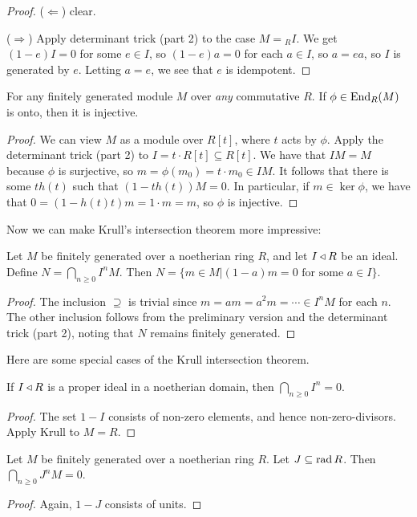  \begin{proof}
   ($\Leftarrow$) clear.

   ($\Rightarrow$) Apply determinant trick (part 2) to the case $M={}_R I$. We get
   $(1-e)I=0$ for some $e\in I$, so $(1-e)a=0$ for each $a\in I$, so $a=ea$, so $I$ is
   generated by $e$. Letting $a=e$, we see that $e$ is idempotent.
 \end{proof}
 \begin{corollary}
   For any finitely generated module $M$ over \emph{any} commutative $R$. If $\phi\in
   \operatorname{End}_R(M)$ is onto, then it is injective.
 \end{corollary}
 \begin{proof}
   We can view $M$ as a module over $R[t]$, where $t$ acts by $\phi$. Apply the
   determinant trick (part 2) to $I=t\cdot R[t]\subseteq R[t]$. We have that $IM=M$
   because $\phi$ is surjective, so $m =\phi(m_0)=t\cdot m_0\in IM$. It follows that
   there is some $th(t)$ such that $(1-th(t))M=0$. In particular, if $m\in  \ker \phi$,
   we have that $0=(1-h(t)t)m=1\cdot m=m$, so $\phi$ is injective.
 \end{proof}
 Now we can make Krull's intersection theorem more impressive:
 \begin{theorem}
   Let $M$ be finitely generated over a noetherian ring $R$, and let $I\triangleleft R$ be an ideal.
   Define $N = \bigcap_{n\ge 0} I^nM$. Then $N=\{m\in M|(1-a)m=0\text{ for some } a\in
   I\}$.
 \end{theorem}
 \begin{proof}
   The inclusion $\supseteq$ is trivial since $m=am=a^2m=\cdots \in I^nM$ for each $n$.
   The other inclusion follows from the preliminary version and the determinant trick
   (part 2), noting that $N$ remains finitely generated.
 \end{proof}
 Here are some special cases of the Krull intersection theorem.
 \begin{corollary}
   If $I\triangleleft R$ is a proper ideal in a noetherian domain, then $\bigcap_{n\ge 0} I^n=0$.
 \end{corollary}
 \begin{proof}
   The set $1-I$ consists of non-zero elements, and hence non-zero-divisors. Apply Krull
   to $M=R$.
 \end{proof}
 \begin{corollary}
   Let $M$ be finitely generated over a noetherian ring $R$. Let $J\subseteq \operatorname{rad} R$.
   Then $\bigcap_{n\ge 0} J^nM=0$.
 \end{corollary}
 \begin{proof}
   Again, $1-J$ consists of units.
 \end{proof}
